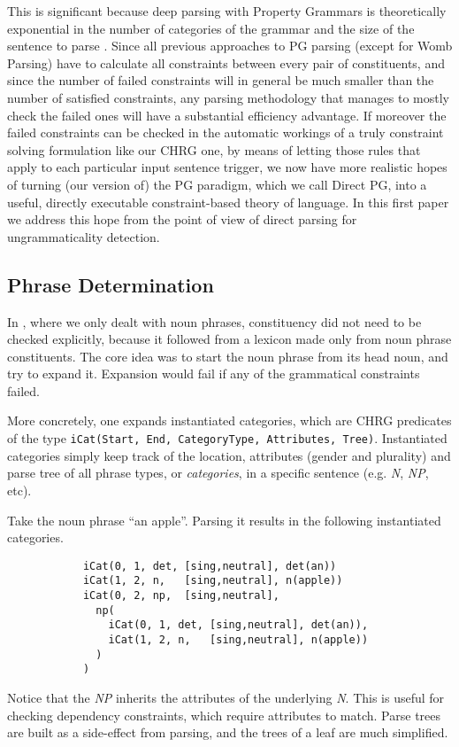 \documentclass{llncs}
\newcommand{\NP}{\textit{NP}\xspace}
\newcommand{\N}{\textit{N}\xspace}
\begin{document}
This is significant because deep parsing with Property Grammars is theoretically exponential in the number of categories of the grammar and the size of the sentence to parse \cite{vanRullen2005}. Since all previous approaches to PG parsing (except for Womb Parsing) have to calculate all constraints between every pair of constituents, and since the number of failed constraints will in general be much smaller than the number of satisfied constraints,  any parsing methodology that manages to mostly check the failed ones will have a substantial efficiency advantage. If moreover the failed constraints can be checked in the automatic workings of a truly constraint solving formulation like our CHRG one, by means of letting those rules that apply to each particular input sentence trigger, we now have more realistic hopes of turning (our version of) the PG paradigm, which we  call Direct PG, into a useful, directly executable constraint-based theory of language. In this first paper we address this hope from the point of view of direct parsing for ungrammaticality detection.


\subsection{Phrase Determination}

In \cite {DM12}, where we only dealt with noun phrases, constituency did not need to be checked explicitly, because it followed from a lexicon made only from noun phrase constituents. The core idea was to start the noun phrase from its head noun, and try to expand it. Expansion would fail if any of the grammatical constraints failed.

More concretely, one expands instantiated categories, which are CHRG predicates of the type \texttt{iCat(Start, End, CategoryType, Attributes, Tree)}. Instantiated categories simply keep track of the location, attributes (gender and plurality) and parse tree of all phrase types, or \emph{categories}, in a specific sentence (e.g. \N, \NP, etc).

\begin{example} \label{ex:icat} Take the noun phrase ``an apple''. Parsing it results in the following instantiated categories.
\begin{verbatim}
            iCat(0, 1, det, [sing,neutral], det(an))
            iCat(1, 2, n,   [sing,neutral], n(apple))
            iCat(0, 2, np,  [sing,neutral],
              np(
                iCat(0, 1, det, [sing,neutral], det(an)),
                iCat(1, 2, n,   [sing,neutral], n(apple))
              )
            )
\end{verbatim}

Notice that the \NP inherits the attributes of the underlying \N. This is useful for checking dependency constraints, which require attributes to match. Parse trees are built as a side-effect from parsing, and the trees of a leaf are much simplified.\end{example}
\end{document}
